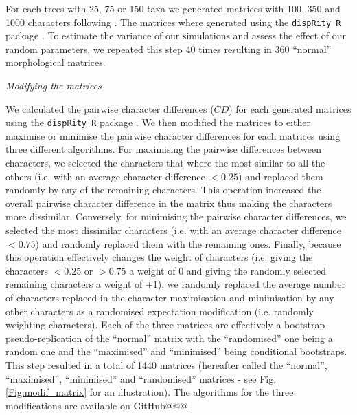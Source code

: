 \documentclass[12pt,letterpaper]{article}
\renewcommand{\subsection}[1]{%
\bigskip
\begin{center}
\begin{large}
\normalfont\itshape #1
\end{large}
\end{center}}
\begin{document}
For each trees with 25, 75 or 150 taxa we generated matrices with 100, 350 and 1000 characters following \cite{OReilly20160081}.
The matrices where generated using the \texttt{dispRity R} package \citep{thomas_guillerme_2016_55646}.
To estimate the variance of our simulations and assess the effect of our random parameters, we repeated this step 40 times resulting in 360 ``normal'' morphological matrices.

\subsection{Modifying the matrices}
We calculated the pairwise character differences ($CD$) for each generated matrices using the \texttt{dispRity R} package \citep{thomas_guillerme_2016_55646}.
We then modified the matrices to either maximise or minimise the pairwise character differences for each matrices using three different algorithms.
For maximising the pairwise differences between characters, we selected the characters that where the most similar to all the others (i.e. with an average character difference $<0.25$) and replaced them randomly by any of the remaining characters.
This operation increased the overall pairwise character difference in the matrix thus making the characters more dissimilar.
Conversely, for minimising the pairwise character differences, we selected the most dissimilar characters (i.e. with an average character difference $<0.75$) and randomly replaced them with the remaining ones.
Finally, because this operation effectively changes the weight of characters (i.e. giving the characters $<0.25$ or $>0.75$ a weight of $0$ and giving the randomly selected remaining characters a weight of +$1$), we randomly replaced the average number of characters replaced in the character maximisation and minimisation by any other characters as a randomised expectation modification (i.e. randomly weighting characters).
Each of the three matrices are effectively a bootstrap pseudo-replication of the ``normal'' matrix with the ``randomised'' one being a random one and the ``maximised'' and ``minimised'' being conditional bootstraps.
This step resulted in a total of 1440 matrices (hereafter called the ``normal'', ``maximised'', ``minimised'' and ``randomised'' matrices - see Fig. \ref{Fig:modif_matrix} for an illustration).
The algorithms for the three modifications are available on GitHub@@@. %
\end{document}
